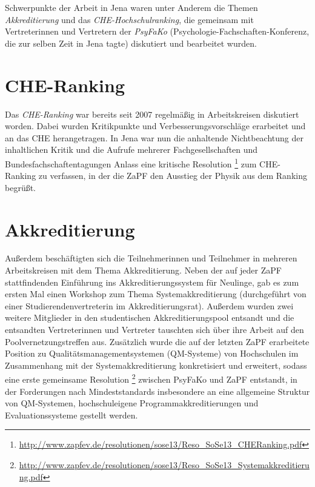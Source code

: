 \documentclass{scrartcl}
\renewcommand{\headrulewidth}{0pt}
\begin{document}
Schwerpunkte der Arbeit in Jena waren unter Anderem die Themen \emph{Akkreditierung} und das \emph{CHE-Hochschulranking}, die gemeinsam mit Vertreterinnen und Vertretern der \emph{PsyFaKo} (Psychologie-Fachschaften-Konferenz, die zur selben Zeit in Jena tagte) diskutiert und bearbeitet wurden.

\pagebreak
\renewcommand{\headrulewidth}{0.1pt}
\rhead{\thepage}

\section*{CHE-Ranking}
Das \emph{CHE-Ranking} war bereits seit 2007 regelmäßig in Arbeitskreisen diskutiert worden. Dabei wurden Kritikpunkte und Verbesserungsvorschläge erarbeitet und an das CHE herangetragen. In Jena war nun die anhaltende Nichtbeachtung der inhaltlichen Kritik und die Aufrufe mehrerer Fachgesellschaften und Bundesfachschaftentagungen Anlass eine kritische Resolution \footnote{\href{http://www.zapfev.de/resolutionen/sose13/Reso\_SoSe13\_CHERanking.pdf}{\url{http://www.zapfev.de/resolutionen/sose13/Reso\_SoSe13\_CHERanking.pdf}}} zum CHE-Ranking zu verfassen, in der die ZaPF den Ausstieg der Physik aus dem Ranking begrüßt.

\section*{Akkreditierung}
Außerdem beschäftigten sich die Teilnehmerinnen und Teilnehmer in mehreren Arbeitskreisen mit dem Thema Akkreditierung. Neben der auf jeder ZaPF stattfindenden Einführung ins Akkreditierungssystem für Neulinge, gab es zum ersten Mal einen Workshop zum Thema Systemakkreditierung (durchgeführt von einer Studierendenvertreterin im Akkreditierungsrat). Außerdem wurden zwei weitere Mitglieder in den studentischen Akkreditierungspool entsandt und die entsandten Vertreterinnen und Vertreter tauschten sich über ihre Arbeit auf den Poolvernetzungstreffen aus. Zusätzlich wurde die auf der letzten ZaPF erarbeitete Position zu Qualitätsmanagementsystemen (QM-Systeme) von Hochschulen im Zusammenhang mit der Systemakkreditierung konkretisiert und erweitert, sodass eine erste gemeinsame Resolution \footnote{\href{http://www.zapfev.de/resolutionen/sose13/Reso\_SoSe13\_Systemakkreditierung.pdf}{\url{http://www.zapfev.de/resolutionen/sose13/Reso\_SoSe13\_Systemakkreditierung.pdf}}} zwischen PsyFaKo und ZaPF entstandt, in der Forderungen nach Mindeststandards insbesondere an eine allgemeine Struktur von QM-Systemen, hochschuleigene Programmakkreditierungen und Evaluationssysteme gestellt werden.
\end{document}

